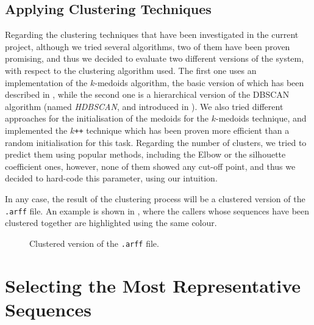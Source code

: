 \subsection{Applying Clustering Techniques}
\label{subsec:clustering-techniques}

Regarding the clustering techniques that have been investigated in the current project, although we tried several algorithms, two of them have been proven promising, and thus we decided to evaluate two different versions of the system, with respect to the clustering algorithm used. The first one uses an implementation of the $k$-medoids algorithm, the basic version of which has been described in , while the second one is a hierarchical version of the DBSCAN algorithm (named \textit{HDBSCAN}, and introduced in \cite{Campello:2013}). We also tried different approaches for the initialisation of the medoids for the $k$-medoids technique, and implemented the $k$\verb!++! technique which has been proven more efficient than a random initialisation for this task. Regarding the number of clusters, we tried to predict them using popular methods, including the Elbow or the silhouette coefficient ones, however, none of them showed any cut-off point, and thus we decided to hard-code this parameter, using our intuition.

In any case, the result of the clustering process will be a clustered version of the \texttt{.arff} file. An example is shown in , where the callers whose sequences have been clustered together are highlighted using the same colour.

\begin{figure}[h]
  
  \vspace{-10pt}
  \caption[Clustered \texttt{.arff} file]{Clustered version of the \texttt{.arff} file.}
\label{listings:arff-clustering}
\end{figure}


\section{Selecting the Most Representative Sequences}
\label{sec:sequence-selection}

